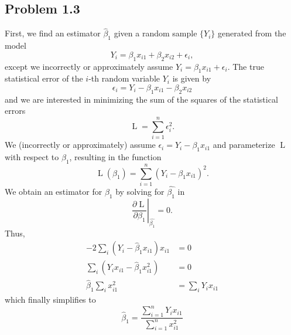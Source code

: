 \documentclass[
]{article}
\begin{document}
\hypertarget{problem-1.3}{%
\subsection{Problem 1.3}\label{problem-1.3}}


First, we find an estimator \(\hat\beta_1\) given a random sample
\(\{Y_i\}\) generated from the model \[
   Y_i = \beta_1 x_{i 1} + \beta_2 x_{i 2} + \epsilon_i,
\] except we incorrectly or approximately assume
\(Y_i = \beta_1 x_{i 1} + \epsilon_i\). The true statistical error of
the \(i\)-th random variable \(Y_i\) is given by \[
   \epsilon_i = Y_i - \beta_1 x_{i 1} - \beta_2 x_{i 2}
\] and we are interested in minimizing the sum of the squares of the
statistical errors \[
   \operatorname{L} = \sum_{i=1}^{n} \epsilon_i^2.
\] We (incorrectly or approximately) assume
\(\epsilon_i = Y_i - \beta_1 x_{i 1}\) and parameterize
\(\operatorname{L}\) with respect to \(\beta_1\), resulting in the
function \[
   \operatorname{L}(\beta_1) = \sum_{i=1}^n (Y_i - \beta_1 x_{i 1})^2.
\] We obtain an estimator for \(\beta_1\) by solving for
\(\hat{\beta_1}\) in \[
   \left. \frac{\partial \operatorname{L}}{\partial \beta_1} \right\vert_{\hat{\beta_1}}= 0.
\] Thus, \begin{align*}
         -2 \sum_i (Y_i - \hat\beta_1 x_{i 1}) x_{i 1} &= 0\\
         \sum_i \left(Y_i x_{i 1} - \hat\beta_1 x_{i 1}^2 \right) &= 0\\
         \hat\beta_1 \sum_i x_{i 1}^2  &= \sum_i Y_i x_{i 1}
\end{align*} which finally simplifies to \[
   \hat\beta_1 = \frac{\sum_{i=1}^n Y_i x_{i 1}}{\sum_{i=1}^n x_{i 1}^2}
\]
\end{document}
